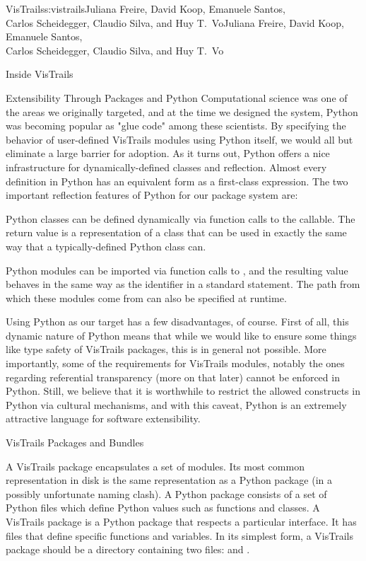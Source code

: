 \begin{aosachaptertoc}{VisTrails}{s:vistrails}{Juliana Freire, David Koop, Emanuele Santos, \\ Carlos Scheidegger, Claudio Silva, and Huy T.\ Vo}{Juliana Freire, David Koop, Emanuele Santos, \\ \hspace*{0.9cm} Carlos Scheidegger, Claudio Silva, and Huy T.\ Vo}
\begin{aosasect1}{Inside VisTrails}
\begin{aosasect2}{Extensibility Through Packages and Python}
Computational science was one of the areas we originally targeted, and
at the time we designed the system, Python was becoming popular as
"glue code" among these scientists. By specifying the behavior of
user-defined VisTrails modules using Python itself, we would all but
eliminate a large barrier for adoption.  As it turns out, Python
offers a nice infrastructure for dynamically-defined classes and
reflection. Almost every definition in Python has an equivalent form
as a first-class expression. The two important reflection features of
Python for our package system are:

\begin{aosaitemize}

  \item Python classes can be defined dynamically via function calls to
  the  callable. The return value is a representation of a
  class that can be used in exactly the same way that a
  typically-defined Python class can.

  \item Python modules can be imported via function calls to
  , and the resulting value behaves in the same
  way as the identifier in a standard  statement. The
  path from which these modules come from can also be specified at runtime.

\end{aosaitemize}

Using Python as our target has a few disadvantages, of course. First
of all, this dynamic nature of Python means that while we would like
to ensure some things like type safety of VisTrails packages, this is
in general not possible.  More importantly, some of the requirements
for VisTrails modules, notably the ones regarding referential
transparency (more on that later) cannot be enforced in Python. Still,
we believe that it is worthwhile to restrict the allowed constructs in
Python via cultural mechanisms, and with this caveat, Python is an
extremely attractive language for software extensibility.

\end{aosasect2}

\begin{aosasect2}{VisTrails Packages and Bundles}

A VisTrails package encapsulates a set of modules. Its most
common representation in disk is the same representation as a Python
package (in a possibly unfortunate naming clash). A Python package
consists of a set of Python files which define Python values such as
functions and classes. A VisTrails package is a Python package that
respects a particular interface. It has files that define specific
functions and variables. In its simplest form, a VisTrails package
should be a directory containing two files:  and
.


\end{aosasect2}
\end{aosasect1}
\end{aosachaptertoc}
